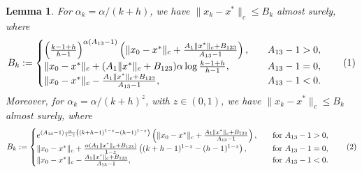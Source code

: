 \documentclass{article}
\newcommand{\numberthis}{\addtocounter{equation}{1}\tag{\theequation}}
\newcommand{\lrp}[1]{\left( #1 \right)}
\newtheorem{lemma}[theorem]{Lemma}
\begin{document}
\begin{lemma}\label{lem:worst_case_bound_original}
For $\alpha_k = \alpha/(k+h)$, we have $\|x_k - x^*\|_c \le B_k$ almost surely, where
\begin{align*}
        B_k := \begin{cases}
            \lrp{\frac{k-1+h}{h-1}}^{\alpha (A_{13}-1)} \lrp{ \|{x}_0 - x^*\|_c + \frac{A_1 \|x^*\|_c + B_{123}}{A_{13}-1} }, \quad & A_{13} - 1 > 0,\\
            \|x_0 - x^*\|_c + (A_1 \|x^*\|_c + B_{123}) \alpha \log \frac{k-1+h}{h-1}, \quad & A_{13} - 1= 0,\\
            \|x_0 - x^*\|_c - \frac{A_1 \|x^*\|_c + B_{123}}{A_{13}- 1}, \quad & A_{13} -1 < 0.
        \end{cases}\numberthis\label{eq:wcbound}
    \end{align*}
    Moreover, for $\alpha_k = \alpha/(k+h)^z$, with $z\in (0,1)$, we have $\|x_k - x^*\|_c \le B_k$ almost surely, where
\begin{align*}
    B_k := \begin{cases}
        e^{(A_{13} - 1) \frac{\alpha}{1-z}\lrp{ (k+h-1)^{1-z} - (h-1)^{1-z} }}\lrp{\|x_0 - x^*\|_c  + \frac{A_1 \|x^*\|_c + B_{123}}{A_{13} - 1}} , \quad &\text{for } A_{13} - 1 > 0,\\
        \|x_0 - x^*\|_c + \frac{\alpha (A_1 \|x^*\|_c + B_{123}) }{1-z}\lrp{ (k+h-1)^{1-z} - (h-1)^{1-z} },\quad &\text{for } A_{13} - 1 = 0,\\
        \|x_0 - x^*\|_c - \frac{A_1 \|x^*\|_c + B_{123}}{A_{13} - 1}, \quad &\text{for } A_{13} - 1 < 0.
    \end{cases}\numberthis\label{eq:wcboundz}
\end{align*}
\end{lemma}
\end{document}
